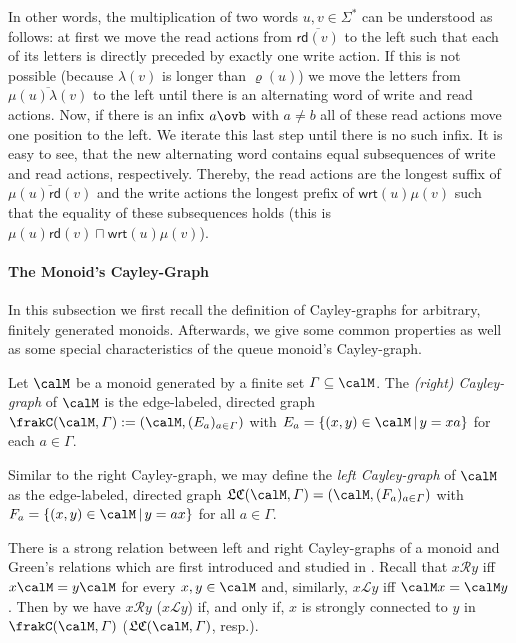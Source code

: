 \documentclass[a4paper,numberwithinsect,USenglish]{lipics-v2018}
\theoremstyle{plain}
\theoremstyle{remark}
\newcommand{\ov}[1]{\overline{#1}}
\newcommand{\rd}[1]{\mathsf{rd}(#1)}
\newcommand{\wrt}[1]{\mathsf{wrt}(#1)}
\newcommand{\lft}[1]{\lambda(#1)}
\newcommand{\mddl}[1]{\mu(#1)}
\newcommand{\rght}[1]{\varrho(#1)}
\newcommand{\cayley}[2]{\frakC(#1,#2)}
\newcommand{\lcayley}[2]{\mathfrak{LC}(#1,#2)}
\newcommand{\grL}{\mathcal{L}}
\newcommand{\grR}{\mathcal{R}}
\begin{document}
In other words, the multiplication of two words $u,v\in\varSigma^*$ can be understood as follows: at first we move the read actions from $\ov{\rd{v}}$ to the left such that each of its letters is directly preceded by exactly one write action. If this is not possible (because $\lft{v}$ is longer than $\rght{u}$) we move the letters from $\ov{\mddl{u}\lft{v}}$ to the left until there is an alternating word of write and read actions. Now, if there is an infix $a\ovb$ with $a\neq b$ all of these read actions move one position to the left. We iterate this last step until there is no such infix. It is easy to see, that the new alternating word contains equal subsequences of write and read actions, respectively. Thereby, the read actions are the longest suffix of $\ov{\mddl{u}\rd{v}}$ and the write actions the longest prefix of $\wrt{u}\mddl{v}$ such that the equality of these subsequences holds (this is $\mddl{u}\rd{v}\sqcap\wrt{u}\mddl{v}$).

\paragraph*{The Monoid's Cayley-Graph}
In this subsection we first recall the definition of Cayley-graphs for arbitrary, finitely generated monoids. Afterwards, we give some common properties as well as some special characteristics of the queue monoid's Cayley-graph.

\begin{definition}
	Let $\calM$ be a monoid generated by a finite set $\varGamma\subseteq\calM$. The \emph{(right) Cayley-graph} of $\calM$ is the edge-labeled, directed graph $\cayley{\calM}{\varGamma}:=(\calM,(E_a)_{a\in\varGamma})$ with
	$E_a=\{(x,y)\in\calM\,|\,y=xa\}$
	for each $a\in\varGamma$.
\end{definition}

Similar to the right Cayley-graph, we may define the \emph{left Cayley-graph} of $\calM$ as the edge-labeled, directed graph $\lcayley{\calM}{\varGamma}=(\calM,(F_a)_{a\in\varGamma})$ with $F_a=\{(x,y)\in\calM\,|\,y=ax\}$ for all $a\in\varGamma$.

\begin{remark}
	There is a strong relation between left and right Cayley-graphs of a monoid and Green's relations which are first introduced and studied in \cite{Gre51}. Recall that $x\grR y$ iff $x\calM=y\calM$ for every $x,y\in\calM$ and, similarly, $x\grL y$ iff $\calM x=\calM y$. Then by \cite[Proposition V.1.1]{pin2010} we have $x\grR y$ ($x\grL y$) if, and only if, $x$ is strongly connected to $y$ in $\cayley{\calM}{\varGamma}$ ($\lcayley{\calM}{\varGamma}$, resp.).
\end{remark}
\end{document}
